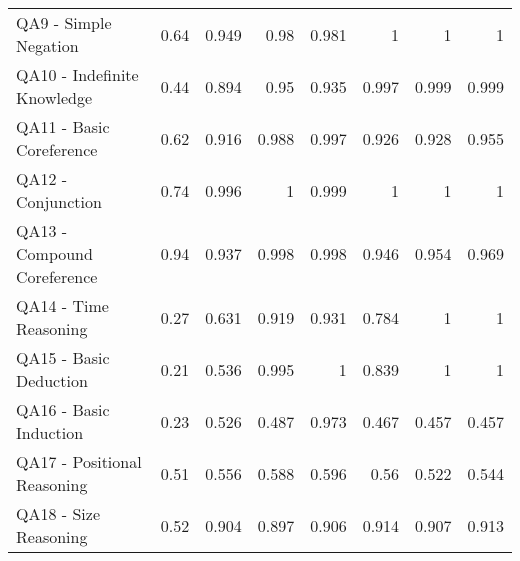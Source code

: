 \begin{tabular}{lrrrrrrr}
 QA9 - Simple Negation        &           0.64  &                        0.949 &                           0.98  &                         0.981   &                       1      &                       1      &                       1      \\
 QA10 - Indefinite Knowledge  &           0.44  &                        0.894 &                           0.95  &                         0.935   &                       0.997  &                       0.999  &                       0.999  \\
 QA11 - Basic Coreference     &           0.62  &                        0.916 &                           0.988 &                         0.997   &                       0.926  &                       0.928  &                       0.955  \\
 QA12 - Conjunction           &           0.74  &                        0.996 &                           1     &                         0.999   &                       1      &                       1      &                       1      \\
 QA13 - Compound Coreference  &           0.94  &                        0.937 &                           0.998 &                         0.998   &                       0.946  &                       0.954  &                       0.969  \\
 QA14 - Time Reasoning        &           0.27  &                        0.631 &                           0.919 &                         0.931   &                       0.784  &                       1      &                       1      \\
 QA15 - Basic Deduction       &           0.21  &                        0.536 &                           0.995 &                         1       &                       0.839  &                       1      &                       1      \\
 QA16 - Basic Induction       &           0.23  &                        0.526 &                           0.487 &                         0.973   &                       0.467  &                       0.457  &                       0.457  \\
 QA17 - Positional Reasoning  &           0.51  &                        0.556 &                           0.588 &                         0.596   &                       0.56   &                       0.522  &                       0.544  \\
 QA18 - Size Reasoning        &           0.52  &                        0.904 &                           0.897 &                         0.906   &                       0.914  &                       0.907  &                       0.913  \\

\end{tabular}
